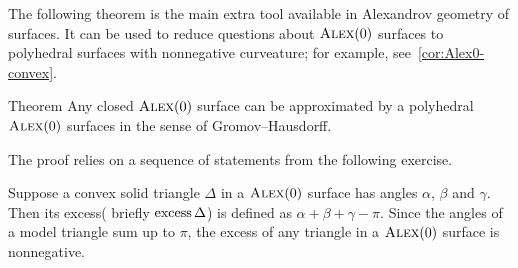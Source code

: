 The following theorem is the main extra tool available in Alexandrov geometry of surfaces.
It can be used to reduce questions about $\textsc{Alex}(0)$ surfaces to polyhedral surfaces with nonnegative curveature; for example, see~\ref{cor:Alex0-convex}.

\begin{thm}{Theorem}\label{thm:approximation}
Any closed $\textsc{Alex}(0)$ surface can be approximated by a polyhedral $\textsc{Alex}(0)$ surfaces in the sense of Gromov--Hausdorff.
\end{thm}

The proof relies on a sequence of statements from the following exercise.

Suppose a convex solid triangle $\Delta$ in a  $\textsc{Alex}(0)$ surface has angles $\alpha$, $\beta$ and $\gamma$.
Then its excess( briefly $\operatorname{\rm excess}\nolimits\Delta$) is defined as $\alpha+\beta+\gamma-\pi$.
Since the angles of a model triangle sum up to $\pi$,
the excess of any triangle in a $\textsc{Alex}(0)$ surface is nonnegative.

